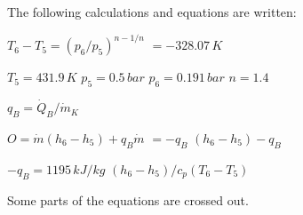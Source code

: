 The following calculations and equations are written:  

\( T_6 - T_5 = (p_6 / p_5)^{n-1/n} \)  
\( = -328.07 \, K \)  

\( T_5 = 431.9 \, K \)  
\( p_5 = 0.5 \, bar \)  
\( p_6 = 0.191 \, bar \)  
\( n = 1.4 \)  

\( q_B = \dot{Q}_B / \dot{m}_K \)  

\( O = \dot{m} (h_6 - h_5) + q_B \dot{m} \)  
\( = -q_B \)  
\( (h_6 - h_5) - q_B \)  

\( -q_B = 1195 \, kJ/kg \)  
\( (h_6 - h_5) / c_p (T_6 - T_5) \)  

Some parts of the equations are crossed out.